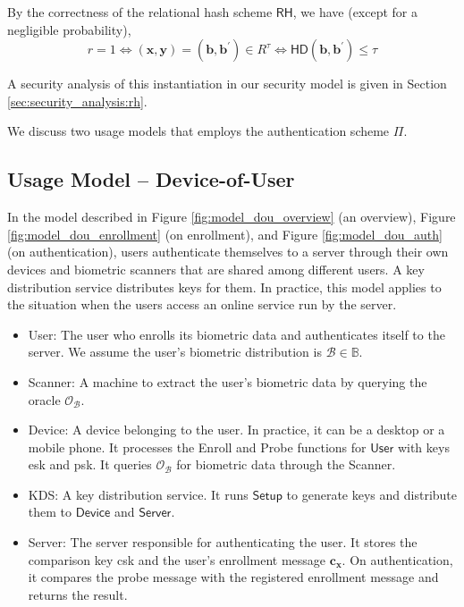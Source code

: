 By the correctness of the relational hash scheme $\textsf{RH}$, we have (except for a negligible probability),
\[
	r = 1 \Leftrightarrow (\mathbf{x}, \mathbf{y}) = (\mathbf{b}, \mathbf{b}^\prime) \in R^\tau \Leftrightarrow \textsf{HD}(\mathbf{b}, \mathbf{b}^\prime) \leq \tau
\]

A security analysis of this instantiation in our security model is given in Section \ref{sec:security_analysis:rh}.



\iffalse

We discuss two usage models that employs the authentication scheme $\Pi$.


\subsection{Usage Model – Device-of-User}
\label{sec:dou_model}

In the model described in Figure \ref{fig:model_dou_overview} (an overview), Figure \ref{fig:model_dou_enrollment} (on enrollment), and Figure \ref{fig:model_dou_auth} (on authentication), users authenticate themselves to a server through their own devices and biometric scanners that are shared among different users.
A key distribution service distributes keys for them. In practice, this model applies to the situation when the users access an online service run by the server.

\begin{itemize}

	\item \textsf{User}: The user who enrolls its biometric data and authenticates itself to the server. We assume the user's biometric distribution is $\mathcal{B} \in \mathbb{B}$. 

	\item \textsf{Scanner}: A machine to extract the user's biometric data by querying the oracle $\mathcal{O}_{\mathcal{B}}$.
	
	\item \textsf{Device}: A device belonging to the user. In practice, it can be a desktop or a mobile phone. It processes the \textsf{Enroll} and \textsf{Probe} functions for $\textsf{User}$ with keys \textsf{esk} and \textsf{psk}. It queries $\mathcal{O}_{\mathcal{B}}$ for biometric data through the \textsf{Scanner}.
	
	\item \textsf{KDS}: A key distribution service. It runs $\textsf{Setup}$ to generate keys and distribute them to $\textsf{Device}$ and $\textsf{Server}$.
		
	\item \textsf{Server}: The server responsible for authenticating the user. It stores the comparison key \textsf{csk} and the user's enrollment message $\mathbf{c_x}$. On authentication, it compares the probe message with the registered enrollment message and returns the result.  

\end{itemize}

